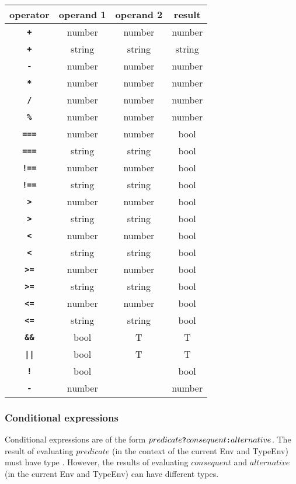 \begin{center}
\begin{tabular}{c|c|c|c}
operator & operand 1 & operand 2 & result\\ \hline
\texttt{\textbf{+}} & number   & number     & number\\
\texttt{\textbf{+}} & string   & string     & string\\
\texttt{\textbf{-}} & number   & number     & number\\
\texttt{\textbf{*}} & number   & number     & number\\
\texttt{\textbf{/}} & number   & number     & number\\
\texttt{\textbf{\%}} & number   & number     & number\\
\texttt{\textbf{===}} & number   & number     & bool\\
\texttt{\textbf{===}} & string   & string     & bool\\
\texttt{\textbf{!==}} & number   & number     & bool\\
\texttt{\textbf{!==}} & string   & string     & bool\\
\texttt{\textbf{>}} & number   & number     & bool\\
\texttt{\textbf{>}} & string   & string     & bool\\
\texttt{\textbf{<}} & number   & number     & bool\\
\texttt{\textbf{<}} & string   & string     & bool\\
\texttt{\textbf{>=}} & number   & number     & bool\\
\texttt{\textbf{>=}} & string   & string     & bool\\
\texttt{\textbf{<=}}    & number   & number     & bool\\
\texttt{\textbf{<=}} & string   & string     & bool\\
\texttt{\textbf{\&\&}} & bool & T & T \\
\texttt{\textbf{||}}   & bool & T & T \\
\texttt{\textbf{!}}    & bool &      & bool\\
\texttt{\textbf{-}}    & number &    & number
\end{tabular}
\end{center}

\subsubsection*{Conditional expressions}

Conditional expressions are of the form $predicate \textbf{\texttt{?}} consequent \textbf{\texttt{:}} alternative$.
The result of evaluating $predicate$ (in the context of the current Env and TypeEnv) must have type . 
However, the results of evaluating $consequent$ and $alternative$ (in the current Env and TypeEnv) can have different types.


